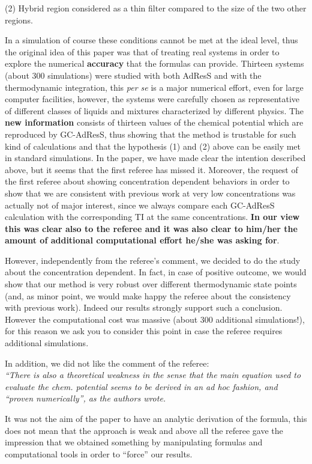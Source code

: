 \documentclass[12pt]{article}
\begin{document}
(2) Hybrid region considered as a thin filter compared to the size of the two other regions.

In a simulation of course these conditions cannot be met at the ideal level, thus the original idea of this paper was that of treating real systems in order to explore the numerical {\bf accuracy} that the formulas can provide. Thirteen systems (about 300 simulations) were studied with both AdResS and with the thermodynamic integration, this {\it per se} is a major numerical effort, even for large computer facilities, however, the systems were carefully chosen as representative of different classes of liquids and mixtures characterized by different physics. The {\bf new information} consists of thirteen values of the chemical potential which are reproduced by GC-AdResS, thus showing that the method is trustable for such kind of calculations and that the hypothesis (1) and (2) above can be easily met in standard simulations.
In the paper, we have made clear the intention described above, but it seems that the first referee has missed it.
Moreover, the request of the first referee about showing concentration dependent behaviors in order to show that we are consistent with previous work at very low concentrations was actually not of major interest, since we always compare each GC-AdResS calculation with the corresponding TI at the same concentrations. {\bf In our view this was clear also to the referee and it was also clear to him/her the amount of additional computational effort he/she was asking for}.

However, independently from the referee's comment, we decided to do the study about the concentration dependent. In fact, in case of positive outcome, we would show that our method is very robust over different thermodynamic state points (and, as minor point, we would make happy the referee about the consistency with previous work). Indeed our results strongly support such a conclusion. However the computational cost was massive (about 300 additional simulations!), for this reason we ask you to consider this point in case the referee requires additional simulations.

In addition, we did not like the comment of the referee:\\
{\color{blue}\it ``There is also a theoretical
  weakness in the sense that the main equation used to evaluate the chem. potential seems to be derived in an ad hoc fashion, and ``proven numerically'', as the authors wrote.}

It was not the aim of the paper to have an analytic derivation of the formula, this does not mean that the approach is weak and above all the referee gave the impression that we obtained something by manipulating formulas and computational tools in order to ``force'' our results.
\end{document}

